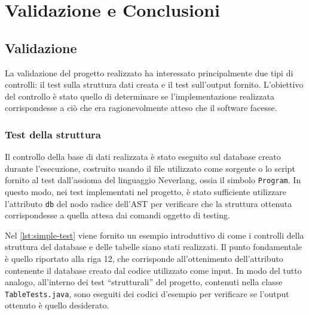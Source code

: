 \documentclass[12pt,a4paper,openright,twoside]{book}
\begin{document}
\chapter{Validazione e Conclusioni}
\label{chap:conclusioni}
\section{Validazione}
\label{chap:validazione}
La validazione del progetto realizzato ha interessato principalmente due tipi di controlli: il test sulla struttura dati creata 
e il test sull’output fornito. L’obiettivo del controllo è stato quello di determinare se l’implementazione realizzata 
corrispondesse a ciò che era ragionevolmente atteso che il software facesse.

\subsection{Test della struttura}
\label{section:test-strutt}
Il controllo della base di dati realizzata è stato eseguito sul database creato durante l’esecuzione, costruito usando il file 
utilizzato come sorgente o lo script fornito al test dall’assioma del linguaggio Neverlang, ossia il simbolo \texttt{Program}. In 
questo modo, nei test implementati nel progetto, è stato sufficiente utilizzare l’attributo \texttt{db} del nodo radice dell’AST 
per verificare che la struttura ottenuta corrispondesse a quella attesa dai comandi oggetto di testing.

Nel \cref{lst:simple-test} viene fornito un esempio introduttivo di come i controlli della struttura del database e delle tabelle 
siano stati realizzati. Il punto fondamentale è quello riportato alla riga 12, che corrisponde all’ottenimento dell’attributo 
contenente il database creato dal codice utilizzato come input. In modo del tutto analogo, all’interno dei test “strutturali” del 
progetto, contenuti nella classe \texttt{TableTests.java}, sono eseguiti dei codici d’esempio per verificare se l’output ottenuto 
è quello desiderato.


\end{document}
